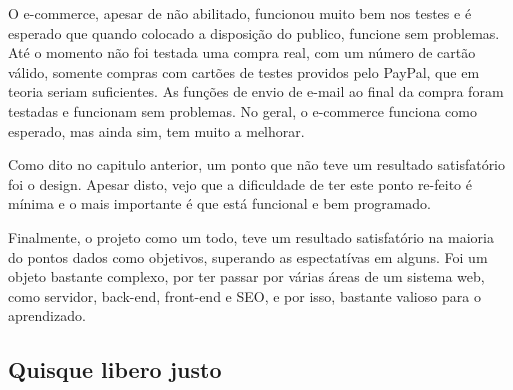 \documentclass[
	12pt,				%
    oneside,			%
	a4paper,			%
	english,			%
	french,				%
	spanish,			%
	brazil				%
	]{abntex2}
\newcommand{\basePath}{/var/www/html/baladecoco/monografia/latex}
\begin{document}
O e-commerce, apesar de não abilitado, funcionou muito bem nos testes e é esperado que quando colocado a disposição do publico, funcione sem problemas. Até o momento não foi testada uma compra real, com um número de cartão válido, somente compras com cartões de testes providos pelo PayPal, que em teoria seriam suficientes. As funções de envio de e-mail ao final da compra foram testadas e funcionam sem problemas. No geral, o e-commerce funciona como esperado, mas ainda sim, tem muito a melhorar.

Como dito no capitulo anterior, um ponto que não teve um resultado satisfatório foi o design. Apesar disto, vejo que a dificuldade de ter este ponto re-feito é mínima e o mais importante é que está funcional e bem programado.

Finalmente, o projeto como um todo, teve um resultado satisfatório na maioria do pontos dados como objetivos, superando as espectatívas em alguns. Foi um objeto bastante complexo, por ter passar por várias áreas de um sistema web, como servidor, back-end, front-end e SEO, e por isso, bastante valioso para o aprendizado.

%
%
%

\postextual



%
%


\begin{apendicesenv}

\partapendices
\chapter{Quisque libero justo}

\end{apendicesenv}
\end{document}

